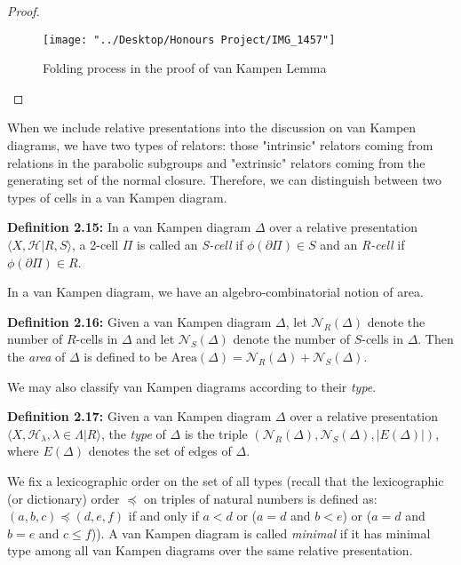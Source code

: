 \documentclass[12pt]{article}
\newcommand{\vs}{\vskip10pt}
\begin{document}
\begin{proof}
\begin{figure} [H]
	\centering
	\texttt{[image: "../Desktop/Honours Project/IMG\_1457"]}
	\caption{Folding process in the proof of van Kampen Lemma}
	\label{fig:img1457}
\end{figure}
		
	\end{proof}
	
	When we include relative presentations into the discussion on van Kampen diagrams, we have two types of relators: those "intrinsic" relators coming from relations in the parabolic subgroups and "extrinsic" relators coming from the generating set of the normal closure. Therefore, we can distinguish between two types of cells in a van Kampen diagram. 
	
	\vs 
	
	\textbf{Definition 2.15: } In a van Kampen diagram $\Delta$ over a relative presentation $\langle X, \mathcal{H} \vert R, S \rangle$, a 2-cell $\Pi$ is called an \textit{S-cell} if $\phi(\partial \Pi) \in S$ and an \textit{R-cell} if $\phi(\partial \Pi) \in R$.

	\vs
	
	In a van Kampen diagram, we have an algebro-combinatorial notion of area.
	
	\vs 
	
	\textbf{Definition 2.16: } Given a van Kampen diagram $\Delta$, let $\mathcal{N}_R(\Delta)$ denote the number of $R$-cells in $\Delta$ and let $\mathcal{N}_S(\Delta)$ denote the number of $S$-cells in $\Delta$. Then the \textit{area} of $\Delta$ is defined to be $\text{Area}(\Delta) = \mathcal{N}_R(\Delta) + \mathcal{N}_S(\Delta)$.
	
	\vs 
	
	We may also classify van Kampen diagrams according to their \textit{type}. 
	
	\vs 
	
	\textbf{Definition 2.17: } Given a van Kampen diagram $\Delta$ over a relative presentation $\langle X, \mathcal{H}_{\lambda}, \lambda \in \Lambda \vert R \rangle $, the \textit{type} of $\Delta$ is the triple $(\mathcal{N}_{R}(\Delta), \mathcal{N}_S(\Delta), \vert E(\Delta) \vert)$, where $E(\Delta)$ denotes the set of edges of $\Delta$. 
	
	\vs 
	
	We fix a lexicographic order on the set of all types (recall that the lexicographic (or dictionary) order $\preccurlyeq$ on triples of natural numbers is defined as: $(a,b,c) \preccurlyeq (d,e,f)$ if and only if $a < d$ or ($a = d$ and $b < e$) or ($a = d$ and $b = e$ and $c \leq f$)). A van Kampen diagram is called \textit{minimal} if it has minimal type among all van Kampen diagrams over the same relative presentation. 
	
\end{document}
